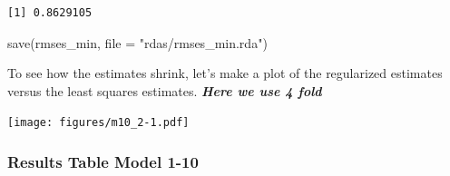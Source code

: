 \documentclass[
]{article}
\newenvironment{Shaded}{}{}
\newcommand{\AttributeTok}[1]{\textcolor[rgb]{0.49,0.56,0.16}{#1}}
\newcommand{\FunctionTok}[1]{\textcolor[rgb]{0.02,0.16,0.49}{#1}}
\newcommand{\NormalTok}[1]{#1}
\newcommand{\OtherTok}[1]{\textcolor[rgb]{0.00,0.44,0.13}{#1}}
\newcommand{\SpecialCharTok}[1]{\textcolor[rgb]{0.25,0.44,0.63}{#1}}
\newcommand{\StringTok}[1]{\textcolor[rgb]{0.25,0.44,0.63}{#1}}
\begin{document}
\begin{Shaded}
\end{Shaded}

\begin{verbatim}
[1] 0.8629105
\end{verbatim}

\begin{Shaded}
\begin{Highlighting}[]
\FunctionTok{save}\NormalTok{(rmses\_min, }\AttributeTok{file =} \StringTok{"rdas/rmses\_min.rda"}\NormalTok{)}
\end{Highlighting}
\end{Shaded}

\newpage

To see how the estimates shrink, let's make a plot of the regularized
estimates versus the least squares estimates. \textbf{\emph{Here we use
4 fold}}

\texttt{[image: figures/m10\_2-1.pdf]}

\newpage

\hypertarget{results-table-model-1-10}{%
\subsubsection{Results Table Model
1-10}\label{results-table-model-1-10}}
\end{document}
